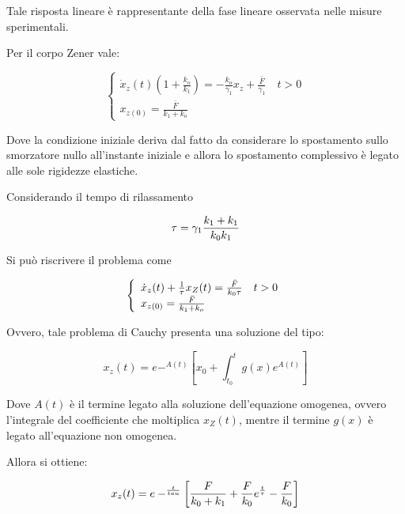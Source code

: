 Tale risposta lineare è rappresentante della fase lineare osservata nelle misure sperimentali. 


Per il corpo Zener vale:

\begin{equation}
	\left\{\begin{array}{l}
		\dot{x}_{z}(t)\left(1+\frac{k_{o}}{k_{1}}\right)=-\frac{k_{o}}{\gamma_{1}} x_{z}+\frac{\bar{F}}{\gamma_{1}} \quad t>0 \\
		x_{z(0)}=\frac{\bar{F}}{k_{1}+k_{o}}
	\end{array}\right.
\end{equation}

Dove la condizione iniziale deriva dal fatto da considerare lo spostamento sullo smorzatore nullo all'instante iniziale e allora lo spostamento complessivo è legato alle sole rigidezze elastiche.

Considerando il tempo di rilassamento

\begin{equation}
\tau={\gamma_1}{k_1+k_1\over k_0k_1}
\end{equation} 


 
Si può riscrivere il problema come

\begin{equation}
		\left\{\begin{array}{l}
		\dot{x}_{z}(t) +{1\over \tau}x_Z(t)={\bar F\over k_0\tau} \quad t>0 \\
		x_{z(0)}=\frac{\bar{F}}{k_{1}+k_{o}}
	\end{array}\right.
\end{equation} 

Ovvero, tale problema di Cauchy presenta una soluzione del tipo:

\begin{equation}
x_z(t)=e-^{A(t)}\left[x_0+\int_{t_0}^{t} g(x) e^{A(t)}\right]
\end{equation}

Dove $A(t)$ è il termine legato alla soluzione dell'equazione omogenea, ovvero l'integrale del coefficiente che moltiplica $x_Z(t)$, mentre il termine $g(x)$ è legato all'equazione non omogenea.

Allora si ottiene:

\begin{equation}
	x_z(t)=e-^{t\over tau}\left[{F\over k_0+k_1}+{F\over k_0}e^{t\over \tau}-{F\over k_0}\right]
\end{equation}

